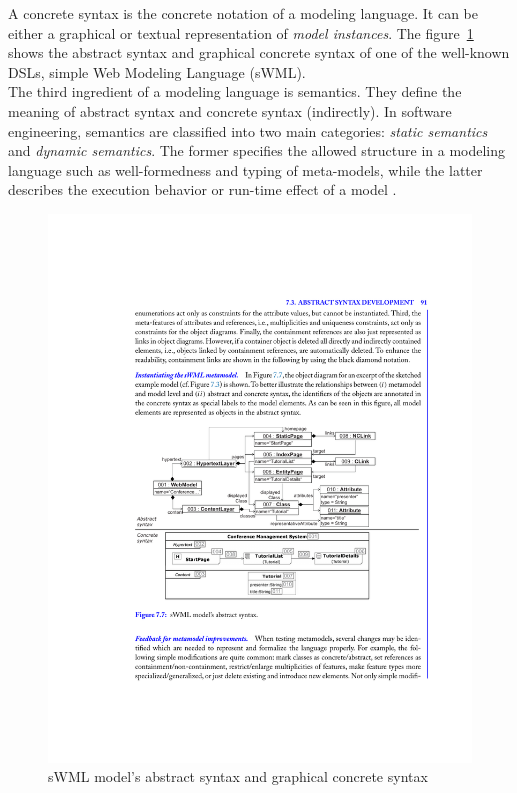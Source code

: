 A concrete syntax is the concrete notation of a modeling language. It can be either a graphical or textual representation of \textit{model instances}. The figure~\ref{fig:brambilla-abstract-concrete} shows the abstract syntax and graphical concrete syntax of one of the well-known DSLs, simple Web Modeling Language (sWML). \\

The third ingredient of a modeling language is semantics. They define the meaning of abstract syntax and concrete syntax (indirectly). In software engineering, semantics are classified into two main categories: \textit{static semantics} and \textit{dynamic semantics}. The former specifies the allowed structure in a modeling language such as well-formedness and typing of meta-models, while the latter describes the execution behavior or run-time effect of a model \cite{Stuurman}.

\begin{figure}[H]
\centering
\captionsetup{justification=centering}
\vspace{0cm}%
\includegraphics[width=0.75\linewidth]{figure/literatures/brambilla_abstract_concrete.pdf}
\caption{sWML model's abstract syntax and graphical concrete syntax \cite{Brambilla}}
\label{fig:brambilla-abstract-concrete}
\end{figure}

